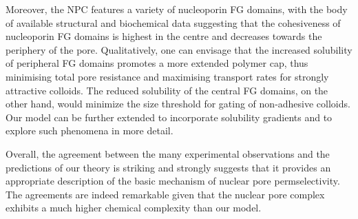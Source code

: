 \documentclass[12pt, a4paper]{article}
\begin{document}
Moreover, the NPC features a variety of nucleoporin FG domains, with the body of available structural and biochemical data suggesting that the cohesiveness of nucleoporin FG domains is highest in the centre and decreases towards the periphery of the pore.
Qualitatively, one can envisage that the increased solubility of peripheral FG domains promotes a more extended polymer cap, thus minimising total pore resistance and maximising transport rates for strongly attractive colloids.
The reduced solubility of the central FG domains, on the other hand, would minimize the size threshold for gating of non-adhesive colloids.
Our model can be further extended to incorporate  solubility gradients and to explore such phenomena in more detail.

Overall, the agreement between the many experimental observations and the predictions of our theory is striking and strongly suggests that it provides an appropriate description of the basic mechanism of nuclear pore permselectivity.
The agreements are indeed remarkable given that the nuclear pore complex exhibits a much higher chemical complexity than our model.



\printbibliography
\end{document}
